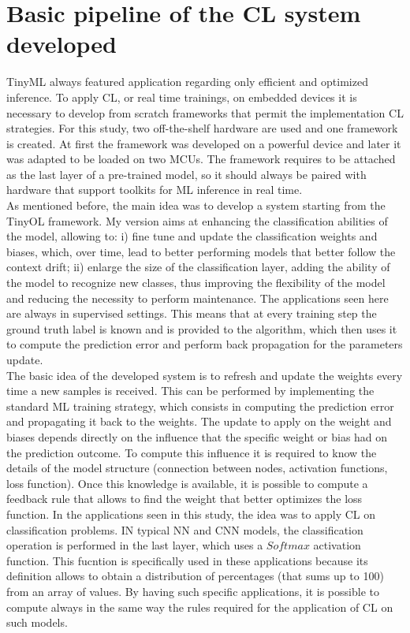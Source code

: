 \documentclass[12pt]{report}
\begin{document}
\section{Basic pipeline of the CL system developed}
\label{basic_system}
TinyML always featured application regarding only efficient and optimized inference. To apply CL, or real time trainings, on embedded devices it is necessary to develop from scratch frameworks that permit the implementation CL strategies. For this study, two off-the-shelf hardware are used and one framework is created. At first the framework was developed on a powerful device and later it was adapted to be loaded on two MCUs. The framework requires to be attached as the last layer of a pre-trained model, so it should always be paired with hardware that support toolkits for ML inference in real time.\\
As mentioned before, the main idea was to develop a system starting from the TinyOL framework. My version aims at enhancing the classification abilities of the model, allowing to: i) fine tune and update the classification weights and biases, which, over time, lead to better performing models that better follow the context drift; ii) enlarge the size of the classification layer, adding the ability of the model to recognize new classes, thus improving the flexibility of the model and reducing the necessity to perform maintenance. The applications seen here are always in supervised settings. This means that at every training step the ground truth label is known and is provided to the algorithm, which then uses it to compute the prediction error and perform back propagation for the parameters update.\\
The basic idea of the developed system is to refresh and update the weights every time a new samples is received. This can be performed by implementing the standard ML training strategy, which consists in computing the prediction error and propagating it back to the weights. The update to apply on the weight and biases depends directly on the influence that the specific weight or bias had on the prediction outcome. To compute this influence it is required to know the details of the model structure (connection between nodes, activation functions, loss function). Once this knowledge is available, it is possible to compute a feedback rule that allows to find the weight that better optimizes the loss function.
In the applications seen in this study, the idea was to apply CL on classification problems. IN typical NN and CNN models, the classification operation is performed in the last layer, which uses a $Softmax$ activation function. This fucntion is specifically used in these applications because its definition allows to obtain a distribution of percentages (that sums up to 100) from an array of values. By having such specific applications, it is possible to compute always in the same way the rules required for the application of CL on such models.\\
\end{document}

